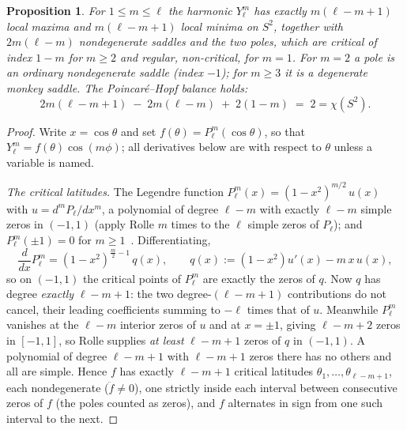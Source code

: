 \documentclass[11pt,a4paper]{article}
\newtheorem{proposition}{Proposition}
\theoremstyle{definition}
\begin{document}
\begin{proposition}\label{prop:count}
For $1\le m\le\ell$ the harmonic $Y_\ell^m$ has exactly $m(\ell-m+1)$ local maxima and $m(\ell-m+1)$ local
minima on $S^2$, together with $2m(\ell-m)$ nondegenerate saddles and the two poles, which are critical of
index $1-m$ for $m\ge2$ and regular, non-critical, for $m=1$. For $m=2$ a pole is an ordinary nondegenerate
saddle (index $-1$); for $m\ge3$ it is a degenerate monkey saddle. The Poincar\'e--Hopf balance holds:
\[
2m(\ell-m+1)\;-\;2m(\ell-m)\;+\;2(1-m)\;=\;2=\chi(S^2).
\]
\end{proposition}
\begin{proof}
Write $x=\cos\theta$ and set $f(\theta)=P_\ell^m(\cos\theta)$, so that $Y_\ell^m=f(\theta)\cos(m\phi)$; all
derivatives below are with respect to $\theta$ unless a variable is named.

\emph{The critical latitudes.} The Legendre function $P_\ell^m(x)=(1-x^2)^{m/2}\,u(x)$ with
$u=d^m P_\ell/dx^m$, a polynomial of degree $\ell-m$ with exactly $\ell-m$ simple zeros in $(-1,1)$ (apply
Rolle $m$ times to the $\ell$ simple zeros of $P_\ell$); and $P_\ell^m(\pm1)=0$ for $m\ge1$~\cite{hobson,szego}.
Differentiating,
\[
\frac{d}{dx}P_\ell^m = (1-x^2)^{\frac{m}{2}-1}\,q(x), \qquad q(x):=(1-x^2)u'(x)-m\,x\,u(x),
\]
so on $(-1,1)$ the critical points of $P_\ell^m$ are exactly the zeros of $q$. Now $q$ has degree
\emph{exactly} $\ell-m+1$: the two degree-$(\ell-m+1)$ contributions do not cancel, their leading coefficients
summing to $-\ell$ times that of $u$. Meanwhile $P_\ell^m$ vanishes at the $\ell-m$ interior zeros of $u$ and
at $x=\pm1$, giving $\ell-m+2$ zeros in $[-1,1]$, so Rolle supplies \emph{at least} $\ell-m+1$ zeros of $q$ in
$(-1,1)$. A polynomial of degree $\ell-m+1$ with $\ell-m+1$ zeros there has no others and all are simple.
Hence $f$ has exactly $\ell-m+1$ critical latitudes $\theta_1,\dots,\theta_{\ell-m+1}$, each nondegenerate
($\ddot f\ne0$), one strictly inside each interval between consecutive zeros of $f$ (the poles counted as
zeros), and $f$ alternates in sign from one such interval to the next.


\end{proof}
\end{document}
